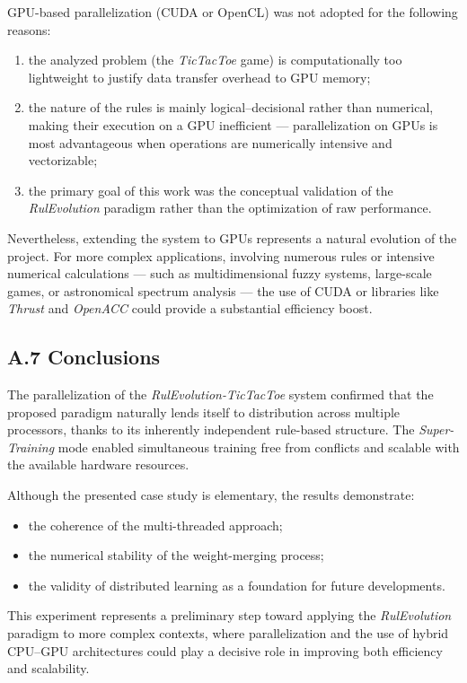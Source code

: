 \documentclass[12pt,a4paper]{article}
\begin{document}
GPU-based parallelization (CUDA or OpenCL) was not adopted for the following reasons:
\begin{enumerate}
  \item the analyzed problem (the \textit{TicTacToe} game) is computationally too lightweight to justify data transfer overhead to GPU memory;
  \item the nature of the rules is mainly logical–decisional rather than numerical, making their execution on a GPU inefficient — parallelization on GPUs is most advantageous when operations are numerically intensive and vectorizable;
  \item the primary goal of this work was the conceptual validation of the \textit{RulEvolution} paradigm rather than the optimization of raw performance.
\end{enumerate}

Nevertheless, extending the system to GPUs represents a natural evolution of the project.  
For more complex applications, involving numerous rules or intensive numerical calculations — such as multidimensional fuzzy systems, large-scale games, or astronomical spectrum analysis — the use of CUDA or libraries like \textit{Thrust} and \textit{OpenACC} could provide a substantial efficiency boost.

\subsection*{A.7 Conclusions}

The parallelization of the \textit{RulEvolution-TicTacToe} system confirmed that the proposed paradigm naturally lends itself to distribution across multiple processors, thanks to its inherently independent rule-based structure.  
The \textit{Super-Training} mode enabled simultaneous training free from conflicts and scalable with the available hardware resources.

Although the presented case study is elementary, the results demonstrate:
\begin{itemize}
  \item the coherence of the multi-threaded approach;
  \item the numerical stability of the weight-merging process;
  \item the validity of distributed learning as a foundation for future developments.
\end{itemize}

This experiment represents a preliminary step toward applying the \textit{RulEvolution} paradigm to more complex contexts, where parallelization and the use of hybrid CPU–GPU architectures could play a decisive role in improving both efficiency and scalability.
\end{document}
